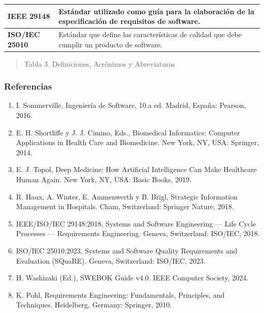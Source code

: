 \documentclass[
]{article}
\newcounter{none} %
\begin{document}
{\def\LTcaptype{none} %
\begin{longtable}[]{@{}
  >{\raggedright\arraybackslash}p{}
  >{\raggedright\arraybackslash}p{}@{}}
\toprule\noalign{}
\begin{minipage}[b]{\linewidth}\raggedright
\textbf{IEEE 29148}
\end{minipage} & \begin{minipage}[b]{\linewidth}\raggedright
Estándar utilizado como guía para la elaboración de la especificación de
requisitos de software.
\end{minipage} \\
\midrule\noalign{}
\endhead
\bottomrule\noalign{}
\endlastfoot
\textbf{ISO/IEC} \textbf{25010} & Estándar que define las características de calidad que
debe cumplir un producto de software. \\
\end{longtable}
}

\begin{quote}
\protect{}\label{_bookmark8}{}Tabla 3. Definiciones,
Acrónimos y Abreviaturas
\end{quote}

\subsubsection{Referencias}\label{referencias}

\begin{enumerate}
\def\labelenumi{\arabic{enumi}.}
\item
  I. Sommerville, Ingeniería de Software, 10.a ed. Madrid, España:
  Pearson, 2016.
\item
  E. H. Shortliffe y J. J. Cimino, Eds., Biomedical Informatics:
  Computer Applications in Health Care and Biomedicine. New York, NY,
  USA: Springer, 2014.
\item
  E. J. Topol, Deep Medicine: How Artificial Intelligence Can Make
  Healthcare Human Again. New York, NY, USA: Basic Books, 2019.
\item
  R. Haux, A. Winter, E. Ammenwerth y B. Brigl, Strategic Information
  Management in Hospitals. Cham, Switzerland: Springer Nature, 2018.
\item
  IEEE/ISO/IEC 29148:2018, Systems and Software Engineering --- Life
  Cycle Processes --- Requirements Engineering. Geneva, Switzerland:
  ISO/IEC, 2018.
\item
  ISO/IEC 25010:2023, Systems and Software Quality Requirements and
  Evaluation (SQuaRE). Geneva, Switzerland: ISO/IEC, 2023.
\item
  H. Washizaki (Ed.), SWEBOK Guide v4.0. IEEE Computer Society, 2024.
\item
  K. Pohl, Requirements Engineering: Fundamentals, Principles, and
  Techniques. Heidelberg, Germany: Springer, 2010.
\end{enumerate}
\end{document}
